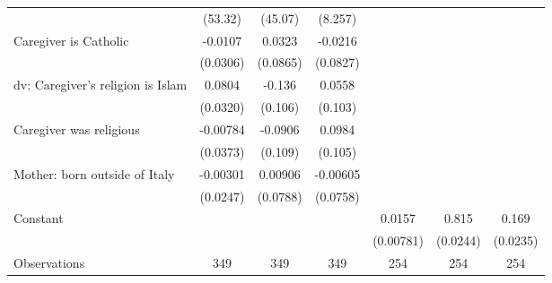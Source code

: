 {\begin{tabular}{l*{6}{c}}
                    &     (53.32)         &     (45.07)         &     (8.257)         &                     &                     &                     \\
\addlinespace
Caregiver is Catholic&     -0.0107         &      0.0323         &     -0.0216         &                     &                     &                     \\
                    &    (0.0306)         &    (0.0865)         &    (0.0827)         &                     &                     &                     \\
\addlinespace
dv: Caregiver's religion is Islam&      0.0804\sym{*}  &      -0.136         &      0.0558         &                     &                     &                     \\
                    &    (0.0320)         &     (0.106)         &     (0.103)         &                     &                     &                     \\
\addlinespace
Caregiver was religious&    -0.00784         &     -0.0906         &      0.0984         &                     &                     &                     \\
                    &    (0.0373)         &     (0.109)         &     (0.105)         &                     &                     &                     \\
\addlinespace
Mother: born outside of Italy&    -0.00301         &     0.00906         &    -0.00605         &                     &                     &                     \\
                    &    (0.0247)         &    (0.0788)         &    (0.0758)         &                     &                     &                     \\
\addlinespace
Constant            &                     &                     &                     &      0.0157\sym{*}  &       0.815\sym{***}&       0.169\sym{***}\\
                    &                     &                     &                     &   (0.00781)         &    (0.0244)         &    (0.0235)         \\
\midrule
Observations        &         349         &         349         &         349         &         254         &         254         &         254         \\
\bottomrule
\end{tabular}
}
